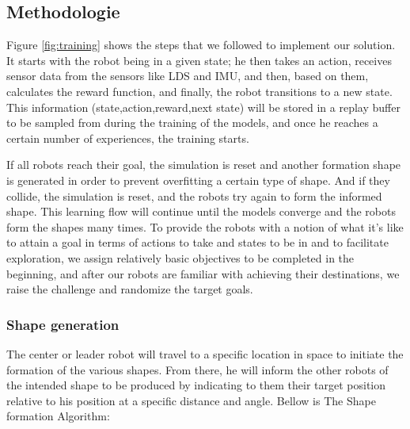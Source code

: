 \documentclass[12pt]{extarticle}
\begin{document}
\subsection{Methodologie}
Figure \ref{fig:training}  shows  the steps that we  followed to implement our solution.
It starts with the robot being in a given state; he then takes an action, receives sensor data from the sensors like LDS and IMU, and then, based on them, calculates the reward function, and finally, the robot transitions to a new state.
This information (state,action,reward,next state) will be stored in a replay buffer to be sampled from during the training of the models, and once he reaches a certain number of experiences, the training starts.

\pagebreak
If all robots reach their goal, the simulation is reset and another formation shape is generated in order to prevent overfitting a certain type of shape.
And if they collide, the simulation is reset, and the robots try again to form the informed shape.
This learning flow will continue until the models converge and the robots form the shapes many times.
To provide the robots with a notion of what it's like to attain a goal in terms of actions to take and states to be in and to facilitate exploration, we assign relatively basic objectives to be completed in the beginning, and after our robots are familiar with achieving their destinations, we raise the challenge and randomize the target goals.



\subsubsection{Shape generation}
The center or leader robot will travel to a specific location in space to initiate the formation of the various shapes. From there, he will inform the other robots of the intended shape to be produced by indicating to them their target position relative to his position at a specific distance and angle. Bellow is The  Shape formation Algorithm:
\end{document}
